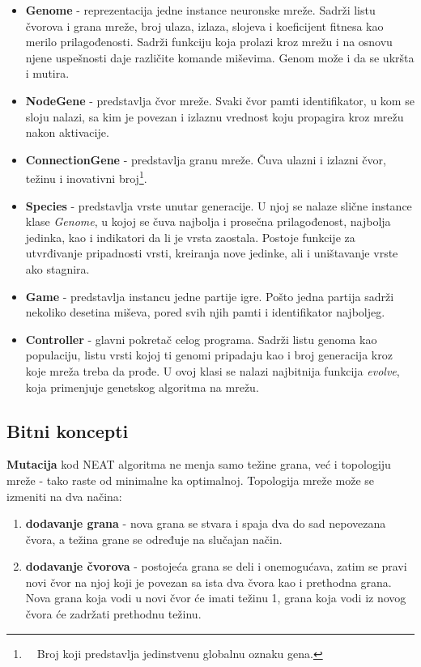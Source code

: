\documentclass[a4paper]{article}
\begin{document}
\begin{itemize}

\item \textbf{Genome} - reprezentacija jedne instance neuronske mreže. Sadrži listu čvorova i grana mreže, broj ulaza, izlaza, slojeva i koeficijent fitnesa kao merilo prilagođenosti. Sadrži funkciju koja prolazi kroz mrežu i na osnovu njene uspešnosti daje različite komande miševima. Genom može i da se ukršta i mutira.

\item \textbf{NodeGene} - predstavlja čvor mreže. Svaki čvor pamti identifikator, u kom se sloju nalazi, sa kim je povezan i izlaznu vrednost koju propagira kroz mrežu nakon aktivacije.

\item \textbf{ConnectionGene} - predstavlja granu mreže. Čuva ulazni i izlazni čvor, težinu i inovativni broj\footnote{~~Broj koji predstavlja jedinstvenu globalnu oznaku gena.}.

\item \textbf{Species} - predstavlja vrste unutar generacije. U njoj se nalaze slične instance klase \emph{Genome}, u kojoj se čuva najbolja i prosečna prilagođenost, najbolja jedinka, kao i indikatori da li je vrsta zaostala. Postoje funkcije za utvrđivanje pripadnosti vrsti, kreiranja nove jedinke, ali i uništavanje vrste ako stagnira.

\item \textbf{Game} - predstavlja instancu jedne partije igre. Pošto jedna partija sadrži nekoliko desetina miševa, pored svih njih pamti i identifikator najboljeg.

\item \textbf{Controller} - glavni pokretač celog programa. Sadrži listu genoma kao populaciju, listu vrsti kojoj ti genomi pripadaju kao i broj generacija kroz koje mreža treba da prođe. U ovoj klasi se nalazi najbitnija funkcija \emph{evolve}, koja primenjuje genetskog algoritma na mrežu.

\end{itemize}

\subsection{Bitni koncepti}

\textbf{Mutacija} kod NEAT algoritma ne menja samo težine grana, već i topologiju mreže - tako raste od minimalne ka optimalnoj. Topologija mreže može se izmeniti na dva načina:
\begin{enumerate}[topsep=1pt, itemsep=-1ex, partopsep=1ex, parsep=1ex]
\item \textbf{dodavanje grana} - nova grana se stvara i spaja dva do sad nepovezana čvora, a težina grane se određuje na slučajan način.
\item \textbf{dodavanje čvorova} - postojeća grana se deli i onemogućava, zatim se pravi novi čvor na njoj koji je povezan sa ista dva čvora kao i prethodna grana. Nova grana koja vodi u novi čvor će imati težinu 1, grana koja vodi iz novog čvora će zadržati prethodnu težinu.\\
\end{enumerate}
\end{document}
